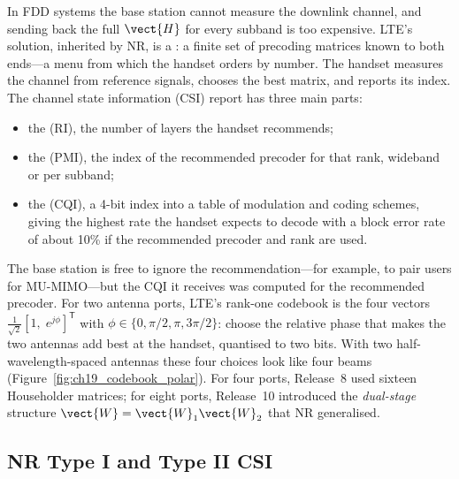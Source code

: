 In FDD systems the base station cannot measure the downlink channel, and sending back the full
$\vect{H}$ for every subband is too expensive. LTE's solution, inherited by NR, is a
: a finite set of precoding matrices known to both ends---a menu from which the
handset orders by number. The handset measures the channel from reference signals, chooses the
best matrix, and reports its index. The channel state information (CSI) report has three main
parts:
\begin{itemize}
\item the  (RI), the number of layers the handset recommends;
\item the  (PMI), the index of the recommended precoder for that
rank, wideband or per subband;
\item the  (CQI), a 4-bit index into a table of modulation and
coding schemes, giving the highest rate the handset expects to decode with a block error rate of
about 10\% if the recommended precoder and rank are used.
\end{itemize}
The base station is free to ignore the recommendation---for example, to pair users for MU-MIMO---but
the CQI it receives was computed for the recommended precoder. For two antenna ports, LTE's rank-one
codebook is the four vectors $\frac{1}{\sqrt2}[1,\;e^{j\phi}]^{\mathsf T}$ with
$\phi\in\{0,\pi/2,\pi,3\pi/2\}$: choose the relative phase that makes the two antennas add best at
the handset, quantised to two bits. With two half-wavelength-spaced antennas these four choices
look like four beams (Figure~\ref{fig:ch19_codebook_polar}). For four ports, Release~8 used sixteen
Householder matrices; for eight ports, Release~10 introduced the \emph{dual-stage} structure
$\vect{W}=\vect{W}_1\vect{W}_2$ that NR generalised.


\subsection{NR Type I and Type II CSI}

